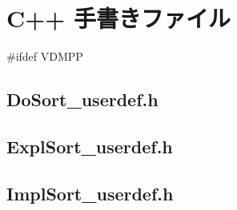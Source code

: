 \documentclass[\pformat,12pt]{jarticle}
\begin{document}
%
%
%
%
%
%
%
%
\section{C++ 手書きファイル}
\label{sec:handcodedfiles}

#ifdef VDMPP

\subsection{DoSort\_userdef.h}

\subsection{ExplSort\_userdef.h}

\subsection{ImplSort\_userdef.h}
\end{document}

